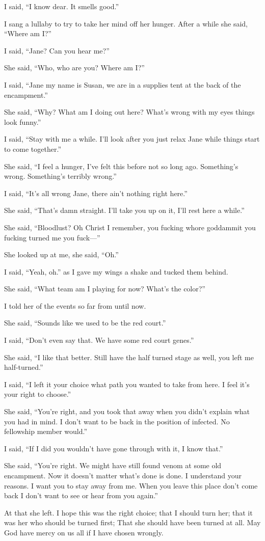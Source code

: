 I said, ``I know dear. It smells good.''

I sang a lullaby to try to take her mind off her hunger. After a while she said, ``Where am I?''

I said, ``Jane? Can you hear me?''

She said, ``Who, who are you? Where am I?''

I said, ``Jane my name is Susan, we are in a supplies tent at the back of the encampment.''

She said, ``Why? What am I doing out here? What's wrong with my eyes things look funny.''

I said, ``Stay with me a while. I'll look after you just relax Jane while things start to come together.''

She said, ``I feel a hunger, I've felt this before not so long ago. Something's wrong. Something's terribly wrong.''

I said, ``It's all wrong Jane, there ain't nothing right here.''

She said, ``That's damn straight. I'll take you up on it, I'll rest here a while.''

\parasep

She said, ``Bloodlust? Oh Christ I remember, you fucking whore goddammit you fucking turned me you fuck---''

She looked up at me, she said, ``Oh.''

I said, ``Yeah, oh.'' as I gave my wings a shake and tucked them behind.

She said, ``What team am I playing for now? What's the color?''

I told her of the events so far from \chichenitza* until now.

She said, ``Sounds like we used to be the red court.''

I said, ``Don't even say that. We have some red court genes.''

She said, ``I like that better. Still have the half turned stage as well, you left me half-turned.''

I said, ``I left it your choice what path you wanted to take from here. I feel it's your right to choose.''

She said, ``You're right, and you took that away when you didn't explain what you had in mind. I don't want to be back in the position of infected. No fellowship member would.''

I said, ``If I did you wouldn't have gone through with it, I know that.''

She said, ``You're right. We might have still found venom at some old encampment. Now it doesn't matter what's done is done. I understand your reasons. I want you to stay away from me. When you leave this place don't come back I don't want to see or hear from you again.''

At that she left. I hope this was the right choice; that I should turn her; that it was her who should be turned first; That she should have been turned at all. May God have mercy on us all if I have chosen wrongly.

